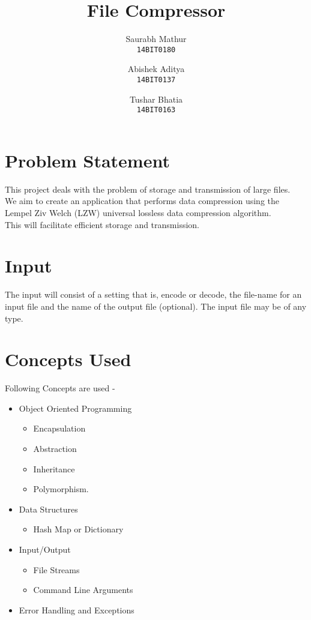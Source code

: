 \documentclass[12pt, a4paper]{article}
\author{
Saurabh Mathur \\
\texttt{14BIT0180}
\and
Abishek Aditya \\
\texttt{14BIT0137}
\and
Tushar Bhatia \\
\texttt{14BIT0163}
}
\title{File Compressor}
\begin{document}
    \maketitle
    
    
    \section*{Problem Statement}
    This project deals with the problem of storage and transmission of large files. \\
    We aim to create an application that performs data compression using the Lempel Ziv Welch (LZW) universal lossless data compression algorithm. 
    \\ This will facilitate efficient storage and transmission.
    \section*{Input}
    The input will consist of a setting that is, encode or decode, the file-name for an input file and the name of the output file (optional). The input file may be of any type.
    \section*{Concepts Used}
    Following Concepts are used -
        \begin{itemize}
        \item Object Oriented Programming
            \begin{itemize}
                \item Encapsulation
                \item Abstraction
                \item Inheritance
                \item Polymorphism.
        
        \end{itemize}
        \item Data Structures
            \begin{itemize}
                \item Hash Map or Dictionary
            \end{itemize}
        \item Input/Output
            \begin{itemize}
                \item File Streams
                \item Command Line Arguments
            \end{itemize}
        \item Error Handling and Exceptions
        \end{itemize}
\end{document}
